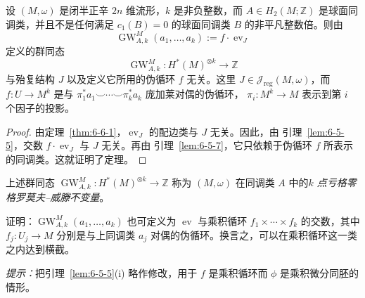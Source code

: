 \begin{theorem}\label{thm:7-1-1}
设 $(M,\omega)$ 是闭半正辛 $2n$ 维流形，$k$ 是非负整数，而
$A\in H_2(M;\mathbb Z)$ 是球面同调类，并且不是任何满足 $c_1(B)=0$ 的球面同调类
$B$ 的非平凡整数倍。则由
\begin{equation}\label{eq:7-1-1}
  \operatorname{GW}^{M}_{A,k}(a_1,\ldots,a_k):=f\cdot\operatorname{ev}_J
\end{equation}
定义的群同态
\[
  \operatorname{GW}^{M}_{A,k}:H^*(M)^{\otimes k}\longrightarrow\mathbb Z
\]
与殆复结构 $J$ 以及定义它所用的伪循环 $f$ 无关。这里
$J\in\mathcal J_{\mathrm{reg}}(M,\omega)$，而 $f:U\to M^k$ 是与
$\pi_1^*a_1\smile\cdots\smile\pi_k^*a_k$ 庞加莱对偶的伪循环，
$\pi_i:M^k\to M$ 表示到第 $i$ 个因子的投影。
\end{theorem}

\begin{proof}
由定理~\ref{thm:6-6-1}，$\operatorname{ev}_J$ 的配边类与 $J$ 无关。因此，由
引理~\ref{lem:6-5-5}，交数 $f\cdot\operatorname{ev}_J$ 与 $J$ 无关。再由
引理~\ref{lem:6-5-7}，它只依赖于伪循环 $f$ 所表示的同调类。这就证明了定理。
\end{proof}

上述群同态
$\operatorname{GW}^{M}_{A,k}:H^*(M)^{\otimes k}\to\mathbb Z$
称为 $(M,\omega)$ 在同调类 $A$ 中的\emph{$k$ 点亏格零格罗莫夫--威滕不变量}。

\begin{exercise}\label{ex:7-1-2}
证明：$\operatorname{GW}^{M}_{A,k}(a_1,\ldots,a_k)$ 也可定义为
$\operatorname{ev}$ 与乘积循环 $f_1\times\cdots\times f_k$ 的交数，其中
$f_j:U_j\to M$ 分别是与上同调类 $a_j$ 对偶的伪循环。换言之，可以在乘积循环这一类
之内达到横截。

\emph{提示：}把引理~\ref{lem:6-5-5}(i) 略作修改，用于 $f$ 是乘积循环而 $\phi$
是乘积微分同胚的情形。
\end{exercise}

